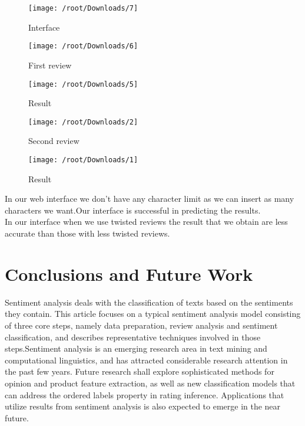 \documentclass[12pt,a4paper]{report}
\begin{document}
\begin{figure}[h]
	\centering
	\texttt{[image: /root/Downloads/7]}\\
	\caption{Interface}
\end{figure}


\begin{figure}[h]
	\centering
	\texttt{[image: /root/Downloads/6]}\\
	\caption{First review}
\end{figure}



\begin{figure}[h]
	\centering
	\texttt{[image: /root/Downloads/5]}\\
	\caption{Result}
\end{figure}

\newpage


\begin{figure}[h]
	\centering
	\texttt{[image: /root/Downloads/2]}\\
	\caption{Second review}
\end{figure}



\begin{figure}[h]
	\centering
	\texttt{[image: /root/Downloads/1]}\\
	\caption{Result}
\end{figure}
In our web interface we don't have any character limit as we can insert as many characters we want.Our interface is successful in predicting the results.\\
In our interface when we use twisted reviews the result that we obtain are less accurate than those with less twisted reviews.


\newpage
\section{Conclusions and Future Work}
\justifying
Sentiment analysis deals with the classification of texts based on the sentiments they contain. This article focuses on a typical sentiment analysis model consisting of three core steps, namely data preparation, review analysis and sentiment classification, and describes representative techniques involved in those steps.Sentiment analysis is an emerging research area in text mining and computational linguistics, and has attracted considerable research attention in the past few years. Future research shall explore sophisticated methods for opinion and product feature extraction, as well as new classification models that can address the ordered labels property in rating inference. Applications that utilize results from sentiment analysis is also expected to emerge in the near future.\\
\end{document}
